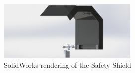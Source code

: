 \begin{figure}[hbp]
    \centering
    \includegraphics[width=0.6\textwidth]{./fall-report pictures/Chapter2-MachineDescription/Shield}
    \caption{SolidWorks rendering of the Safety Shield}
    \label{fig:Control Panel}
\end{figure} 